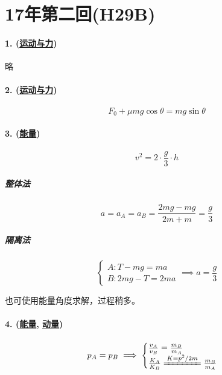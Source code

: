 
\section{17年第二回(H29B)}

\paragraph{1. (\hyperref[subsec:运动与力]{运动与力})} 略
\paragraph{2. (\hyperref[subsec:运动与力]{运动与力})}

\begin{equation*}
    F_0+\mu mg\cos\theta=mg\sin\theta
\end{equation*}

\paragraph{3. (\hyperref[subsec:能量]{能量})}

\begin{equation*}
    v^2=2\cdot\frac{g}{3}\cdot h
\end{equation*}

\subparagraph{整体法}

\begin{equation*}
    a=a_A=a_B=\frac{2mg-mg}{2m+m}=\frac{g}{3}
\end{equation*}

\subparagraph{隔离法}

\begin{equation*}
    \begin{cases}
        A: T-mg=ma\\
        B: 2mg-T=2ma
    \end{cases}\implies
    a=\frac{g}{3}
\end{equation*}

也可使用能量角度求解，过程稍多。

\paragraph{4. (\hyperref[subsec:能量]{能量}, \hyperref[subsec:动量]{动量})}

\begin{gather*}
    p_A=p_B\implies
    \begin{cases}
        \frac{v_A}{v_B}=\frac{m_B}{m_A}\\
        \frac{K_A}{K_B}\xlongequal{K=p^2/2m}\frac{m_B}{m_A}
    \end{cases}
\end{gather*}


